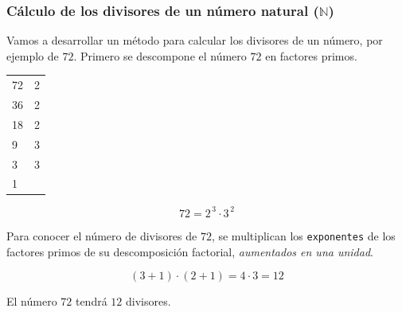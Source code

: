 \documentclass[11pt, twocolumn, landscape, a4paper]{article}
\begin{document}
\subsubsection*{Cálculo de los divisores de un número natural ($\mathbb{N}$)}

\noindent Vamos a desarrollar un método para calcular los divisores de un número, por ejemplo de $72$. Primero se descompone el número $72$ en factores primos.

\begin{center}
\begin{tabular}{l|r}
72 & 2 \\
36 & 2 \\
18 & 2 \\
9 & 3 \\
3 & 3 \\
1 
\end{tabular}
\end{center}

$$72 = 2^{\,3} \cdot 3^{\,2}$$

Para conocer el número de divisores de $72$, se multiplican los {\tt exponentes} de los factores primos de su descomposición factorial, \emph{aumentados en una unidad}. 

$$
(3 + 1) \cdot (2 + 1) = 4 \cdot 3 = 12
$$

El número $72$ tendrá $12$ divisores.

\end{document}
